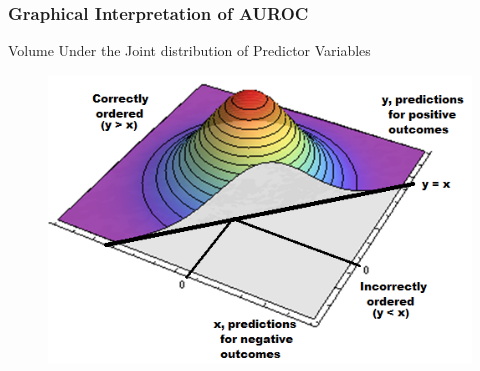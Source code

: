 \documentclass{beamer}
\begin{document}

\begin{frame}
\frametitle{Graphical Interpretation of AUROC}

Volume Under the Joint distribution of Predictor Variables
\begin{figure}
    \includegraphics[scale =  0.65 ]{Figs/AUROC_vol_3.png}
\end{figure}

\end{frame}


\end{document}
